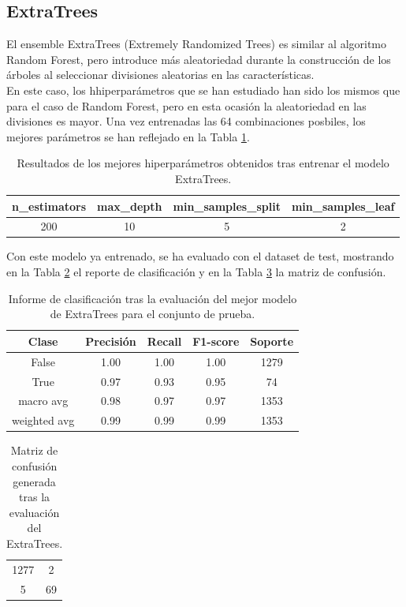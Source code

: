 \documentclass[12pt,letterpaper]{article}
\begin{document}
\subsection{ExtraTrees}
El ensemble ExtraTrees (Extremely Randomized Trees) es similar al algoritmo Random Forest, pero introduce más aleatoriedad durante la construcción de los árboles al seleccionar divisiones aleatorias en las características.\\
En  este caso, los hhiperparámetros que se han estudiado han sido los mismos que para el caso de Random Forest, pero en esta ocasión la aleatoriedad en las divisiones es mayor. Una vez entrenadas las 64 combinaciones posbiles, los mejores parámetros se han reflejado en la Tabla \ref{tab:hiper-ET}.
\begin{table}[H]
    \centering
    \begin{tabular}{cccc}
    \hline
    \textbf{n\_estimators} &  \textbf{max\_depth} & \textbf{min\_samples\_split} & \textbf{min\_samples\_leaf} \\ \hline
    200 & 10 & 5 & 2 \\ \hline
    \end{tabular}
    \caption{Resultados de los mejores hiperparámetros obtenidos tras entrenar el modelo ExtraTrees.}
    \label{tab:hiper-ET}
\end{table}

Con este modelo ya entrenado, se ha evaluado con el dataset de test, mostrando en la Tabla \ref{tab:res-ET} el reporte de clasificación y en la Tabla \ref{tab:confusion-ET} la matriz de confusión.
\begin{table}[H]
    \centering
    \begin{tabular}{ccccc}
    \hline
    \textbf{Clase} & \textbf{Precisión} & \textbf{Recall} & \textbf{F1-score} & \textbf{Soporte} \\ \hline
    False & 1.00 & 1.00 & 1.00 & 1279 \\ 
    True & 0.97 & 0.93 & 0.95 &  74 \\ 
     macro avg & 0.98 & 0.97 & 0.97 & 1353 \\ 
    weighted avg  & 0.99 & 0.99 & 0.99 & 1353 \\ \hline
    \end{tabular}
    \caption{Informe de clasificación tras la evaluación del mejor modelo de ExtraTrees para el conjunto de prueba.}
    \label{tab:res-ET}
\end{table}

\begin{table}[H]
    \centering
    \begin{tabular}{|cc|}
    \hline
    1277 & 2 \\
    5 & 69 \\ \hline
    \end{tabular}
    \caption{Matriz de confusión generada tras la evaluación del ExtraTrees.}
    \label{tab:confusion-ET}
\end{table}
\end{document}

